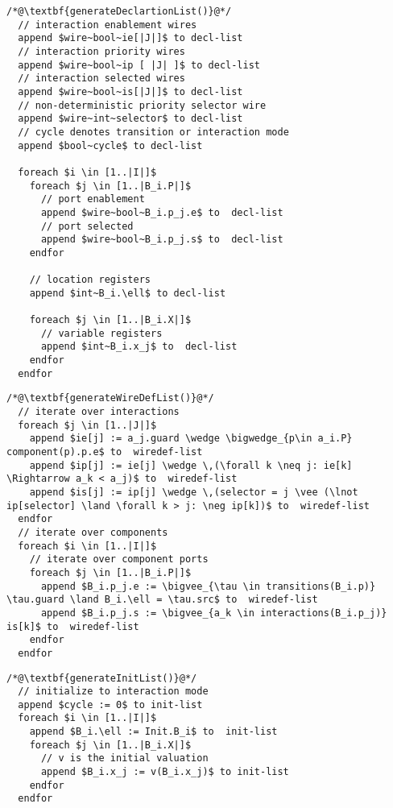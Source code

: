 \begin{lstlisting}
/*@\textbf{generateDeclartionList()}@*/
  // interaction enablement wires
  append $wire~bool~ie[|J|]$ to decl-list
  // interaction priority wires
  append $wire~bool~ip [ |J| ]$ to decl-list 
  // interaction selected wires
  append $wire~bool~is[|J|]$ to decl-list 
  // non-deterministic priority selector wire
  append $wire~int~selector$ to decl-list 
  // cycle denotes transition or interaction mode
  append $bool~cycle$ to decl-list  

  foreach $i \in [1..|I|]$
    foreach $j \in [1..|B_i.P|]$ 
      // port enablement
      append $wire~bool~B_i.p_j.e$ to  decl-list 
      // port selected
      append $wire~bool~B_i.p_j.s$ to  decl-list 
    endfor

    // location registers
    append $int~B_i.\ell$ to decl-list
    
    foreach $j \in [1..|B_i.X|]$ 
      // variable registers
      append $int~B_i.x_j$ to  decl-list 
    endfor
  endfor
\end{lstlisting}


\begin{lstlisting}
/*@\textbf{generateWireDefList()}@*/
  // iterate over interactions
  foreach $j \in [1..|J|]$ 
    append $ie[j] := a_j.guard \wedge \bigwedge_{p\in a_i.P} component(p).p.e$ to  wiredef-list 
    append $ip[j] := ie[j] \wedge \,(\forall k \neq j: ie[k] \Rightarrow a_k < a_j)$ to  wiredef-list 
    append $is[j] := ip[j] \wedge \,(selector = j \vee (\lnot ip[selector] \land \forall k > j: \neg ip[k])$ to  wiredef-list 
  endfor
  // iterate over components
  foreach $i \in [1..|I|]$ 
    // iterate over component ports
    foreach $j \in [1..|B_i.P|]$ 
      append $B_i.p_j.e := \bigvee_{\tau \in transitions(B_i.p)} \tau.guard \land B_i.\ell = \tau.src$ to  wiredef-list 
      append $B_i.p_j.s := \bigvee_{a_k \in interactions(B_i.p_j)} is[k]$ to  wiredef-list 
    endfor
  endfor
\end{lstlisting}

\begin{lstlisting}
/*@\textbf{generateInitList()}@*/
  // initialize to interaction mode
  append $cycle := 0$ to init-list 
  foreach $i \in [1..|I|]$
    append $B_i.\ell := Init.B_i$ to  init-list 
    foreach $j \in [1..|B_i.X|]$
      // v is the initial valuation
      append $B_i.x_j := v(B_i.x_j)$ to init-list  
    endfor
  endfor
\end{lstlisting}

